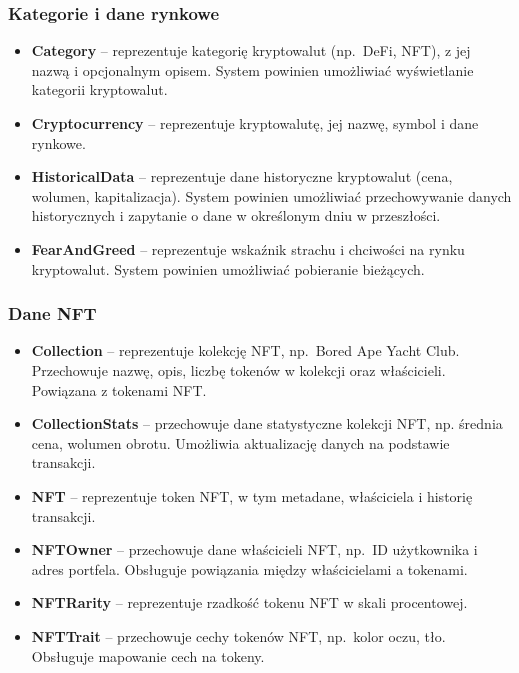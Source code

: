 \subsubsection{Kategorie i dane rynkowe}
\begin{itemize}
\item \textbf{Category} -- reprezentuje kategorię kryptowalut (np.\ DeFi, NFT), z jej nazwą i opcjonalnym opisem. System powinien umożliwiać wyświetlanie kategorii kryptowalut.
\item \textbf{Cryptocurrency} -- reprezentuje kryptowalutę, jej nazwę, symbol i dane rynkowe.
\item \textbf{HistoricalData} -- reprezentuje dane historyczne kryptowalut (cena, wolumen, kapitalizacja). System powinien umożliwiać przechowywanie danych historycznych i zapytanie o dane w określonym dniu w przeszłości.
\item \textbf{FearAndGreed} -- reprezentuje wskaźnik strachu i chciwości na rynku kryptowalut. System powinien umożliwiać pobieranie bieżących.
\end{itemize}

\subsubsection{Dane NFT}
\begin{itemize}
\item \textbf{Collection} -- reprezentuje kolekcję NFT, np.\ Bored Ape Yacht Club. Przechowuje nazwę, opis, liczbę tokenów w kolekcji oraz właścicieli. Powiązana z tokenami NFT.
\item \textbf{CollectionStats} -- przechowuje dane statystyczne kolekcji NFT, np. średnia cena, wolumen obrotu. Umożliwia aktualizację danych na podstawie transakcji.
\item \textbf{NFT} -- reprezentuje token NFT, w tym metadane, właściciela i historię transakcji.
\item \textbf{NFTOwner} -- przechowuje dane właścicieli NFT, np.\ ID użytkownika i adres portfela. Obsługuje powiązania między właścicielami a tokenami.
\item \textbf{NFTRarity} -- reprezentuje rzadkość tokenu NFT w skali procentowej.
\item \textbf{NFTTrait} -- przechowuje cechy tokenów NFT, np.\ kolor oczu, tło. Obsługuje mapowanie cech na tokeny.
\end{itemize}

